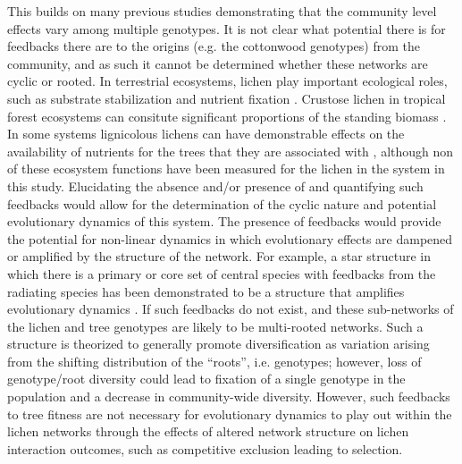 \documentclass[11pt,twocolumn,twoside,lineno]{pnas-new}
\begin{document}
This builds on many previous studies demonstrating that the community
level effects vary among multiple genotypes. It is not clear what
potential there is for feedbacks there are to the origins (e.g. the
cottonwood genotypes) from the community, and as such it cannot be
determined whether these networks are cyclic or rooted. In terrestrial
ecosystems, lichen play important ecological roles, such as substrate
stabilization and nutrient fixation \cite{Nelson2018}. Crustose lichen
in tropical forest ecosystems can consitute significant proportions of
the standing biomass \cite{Miranda-Gonzalez}. In some systems
lignicolous lichens can have demonstrable effects on the availability
of nutrients for the trees that they are associated with
\cite{Norby1989}, although non of these ecosystem functions have been
measured for the lichen in the system in this study. Elucidating the
absence and/or presence of and quantifying such feedbacks would allow
for the determination of the cyclic nature and potential evolutionary
dynamics of this system. The presence of feedbacks would provide the
potential for non-linear dynamics in which evolutionary effects are
dampened or amplified by the structure of the network. For example, a
star structure in which there is a primary or core set of central
species with feedbacks from the radiating species has been
demonstrated to be a structure that amplifies evolutionary dynamics
\cite{Lieberman2005EvolutionaryGraphs}. If such feedbacks do not
exist, and these sub-networks of the lichen and tree genotypes are
likely to be multi-rooted networks. Such a structure is theorized to
generally promote diversification as variation arising from the
shifting distribution of the ``roots'', i.e. genotypes; however, loss
of genotype/root diversity could lead to fixation of a single genotype
in the population and a decrease in community-wide diversity. However,
such feedbacks to tree fitness are not necessary for evolutionary
dynamics to play out within the lichen networks through the effects of
altered network structure on lichen interaction outcomes, such as
competitive exclusion leading to selection. 
\end{document}
